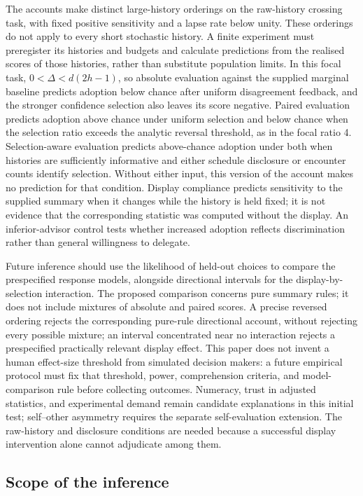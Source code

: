 \documentclass[
  british,
  11pt,
]{article}
\begin{document}
The accounts make distinct large-history orderings on the raw-history
crossing task, with fixed positive sensitivity and a lapse rate below
unity. These orderings do not apply to every short stochastic history. A
finite experiment must preregister its histories and budgets and
calculate predictions from the realised scores of those histories,
rather than substitute population limits. In this focal task,
\(0<\Delta<d(2h-1)\), so absolute evaluation against the supplied
marginal baseline predicts adoption below chance after uniform
disagreement feedback, and the stronger confidence selection also leaves
its score negative. Paired evaluation predicts adoption above chance
under uniform selection and below chance when the selection ratio
exceeds the analytic reversal threshold, as in the focal ratio 4.
Selection-aware evaluation predicts above-chance adoption under both
when histories are sufficiently informative and either schedule
disclosure or encounter counts identify selection. Without either input,
this version of the account makes no prediction for that condition.
Display compliance predicts sensitivity to the supplied summary when it
changes while the history is held fixed; it is not evidence that the
corresponding statistic was computed without the display. An
inferior-advisor control tests whether increased adoption reflects
discrimination rather than general willingness to delegate.

Future inference should use the likelihood of held-out choices to
compare the prespecified response models, alongside directional
intervals for the display-by-selection interaction. The proposed
comparison concerns pure summary rules; it does not include mixtures of
absolute and paired scores. A precise reversed ordering rejects the
corresponding pure-rule directional account, without rejecting every
possible mixture; an interval concentrated near no interaction rejects a
prespecified practically relevant display effect. This paper does not
invent a human effect-size threshold from simulated decision makers: a
future empirical protocol must fix that threshold, power, comprehension
criteria, and model-comparison rule before collecting outcomes.
Numeracy, trust in adjusted statistics, and experimental demand remain
candidate explanations in this initial test; self--other asymmetry
requires the separate self-evaluation extension. The raw-history and
disclosure conditions are needed because a successful display
intervention alone cannot adjudicate among them.

\subsection{Scope of the inference}\label{scope-of-the-inference}
\end{document}

